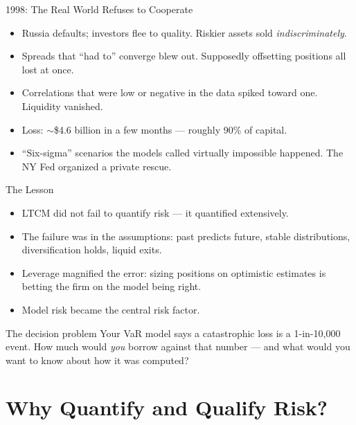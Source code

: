 \documentclass[11pt, aspectratio=169]{beamer}
\begin{document}
\begin{frame}{1998: The Real World Refuses to Cooperate}
\begin{itemize}
  \item Russia defaults; investors flee to quality. Riskier assets sold \emph{indiscriminately}.
  \item Spreads that ``had to'' converge blew out. Supposedly offsetting positions all lost at once.
  \item Correlations that were low or negative in the data spiked toward one. Liquidity vanished.
  \item Loss: $\sim$\$4.6 billion in a few months --- roughly 90\% of capital.
  \item ``Six-sigma'' scenarios the models called virtually impossible happened. The NY Fed organized a private rescue.
\end{itemize}
\end{frame}

\begin{frame}{The Lesson}
\begin{itemize}
  \item LTCM did not fail to quantify risk --- it quantified extensively.
  \item The failure was in the \alert{assumptions}: past predicts future, stable distributions, diversification holds, liquid exits.
  \item Leverage magnified the error: sizing positions on optimistic estimates is betting the firm on the model being right.
  \item \alert{Model risk} became the central risk factor.
\end{itemize}
\medskip
\begin{block}{The decision problem}
Your VaR model says a catastrophic loss is a 1-in-10{,}000 event. How much would \emph{you} borrow against that number --- and what would you want to know about how it was computed?
\end{block}
\end{frame}

\section{Why Quantify and Qualify Risk?}
\end{document}
